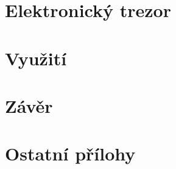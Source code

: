 \documentclass{template/DMP}
\begin{document}
{


%

\newpage
\chapter{Elektronický trezor}
\label{E4}

















\chapter{Využití}


\chapter{Závěr}



\appendix


\chapter{Ostatní přílohy}

}
\end{document}

